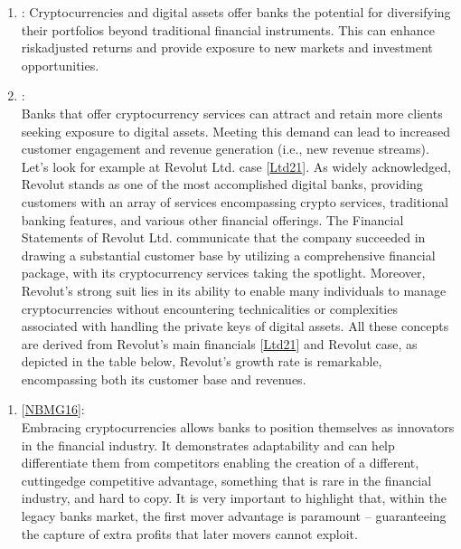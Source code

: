 \documentclass[letterpaper,10pt,english]{jupyterBook}
\begin{document}
\begin{enumerate}
%
\item {} 
\sphinxAtStartPar
{}:
Cryptocurrencies and digital assets offer banks the potential for diversifying their portfolios beyond traditional financial instruments. This can enhance risk\sphinxhyphen{}adjusted returns and provide exposure to new markets and investment opportunities.

\item {} 
\sphinxAtStartPar
{}:\\
Banks that offer cryptocurrency services can attract and retain more clients seeking exposure to digital assets. Meeting this demand can lead to increased customer engagement and revenue generation (i.e., new revenue streams). Let’s look for example at Revolut Ltd. case {[}\hyperlink{cite.ARM/arm:id150}{Ltd21}{]}. As widely acknowledged, Revolut stands as one of the most accomplished digital banks, providing customers with an array of services encompassing crypto services, traditional banking features, and various other financial offerings. The Financial Statements of Revolut Ltd. communicate that the company succeeded in drawing a substantial customer base by utilizing a comprehensive financial package, with its cryptocurrency services taking the spotlight. Moreover, Revolut’s strong suit lies in its ability to enable many individuals to manage cryptocurrencies without encountering technicalities or complexities associated with handling the private keys of digital assets. All these concepts are derived from Revolut’s main financials {[}\hyperlink{cite.ARM/arm:id150}{Ltd21}{]} and Revolut case, as depicted in the table below, Revolut’s growth rate is remarkable, encompassing both its customer base and revenues. 

\end{enumerate}




\begin{enumerate}
%
\setcounter{enumi}{2}
\item {} 
\sphinxAtStartPar
{} {[}\hyperlink{cite.ARM/arm:id144}{NBMG16}{]}:\\
Embracing cryptocurrencies allows banks to position themselves as innovators in the financial industry. It demonstrates adaptability and can help differentiate them from competitors enabling the creation of a different, cutting\sphinxhyphen{}edge competitive advantage, something that is rare in the financial industry, and hard to copy. It is very important to highlight that, within the legacy banks market, the first mover advantage is paramount – guaranteeing the capture of extra profits that later movers cannot exploit.

\end{enumerate}
\end{document}
